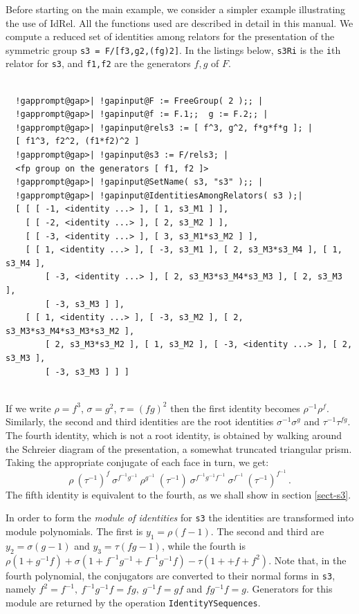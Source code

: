 \documentclass[a4paper,11pt]{report}
\begin{document}
{{ Before starting on the main example, we consider a simpler example
illustrating the use of \textsf{IdRel}. All the functions used are described in detail in this manual. We compute a
reduced set of identities among relators for the presentation of the symmetric
group \texttt{s3 =
F/[f\texttt{}3,g\texttt{}2,(fg)\texttt{}2]}. In the listings below, \texttt{s3{\textunderscore}Ri} is the \texttt{i}\texttt{}th relator for \texttt{s3}, and \texttt{f1,f2} are the generators $f,g$ of $F$. 

 
\begin{Verbatim}[commandchars=!@|,fontsize=\small,frame=single,label=Example]
  
  !gapprompt@gap>| !gapinput@F := FreeGroup( 2 );; |
  !gapprompt@gap>| !gapinput@f := F.1;;  g := F.2;; |
  !gapprompt@gap>| !gapinput@rels3 := [ f^3, g^2, f*g*f*g ]; |
  [ f1^3, f2^2, (f1*f2)^2 ]
  !gapprompt@gap>| !gapinput@s3 := F/rels3; |
  <fp group on the generators [ f1, f2 ]>
  !gapprompt@gap>| !gapinput@SetName( s3, "s3" );; |
  !gapprompt@gap>| !gapinput@IdentitiesAmongRelators( s3 );|
  [ [ [ -1, <identity ...> ], [ 1, s3_M1 ] ], 
    [ [ -2, <identity ...> ], [ 2, s3_M2 ] ], 
    [ [ -3, <identity ...> ], [ 3, s3_M1*s3_M2 ] ], 
    [ [ 1, <identity ...> ], [ -3, s3_M1 ], [ 2, s3_M3*s3_M4 ], [ 1, s3_M4 ], 
        [ -3, <identity ...> ], [ 2, s3_M3*s3_M4*s3_M3 ], [ 2, s3_M3 ], 
        [ -3, s3_M3 ] ], 
    [ [ 1, <identity ...> ], [ -3, s3_M2 ], [ 2, s3_M3*s3_M4*s3_M3*s3_M2 ], 
        [ 2, s3_M3*s3_M2 ], [ 1, s3_M2 ], [ -3, <identity ...> ], [ 2, s3_M3 ], 
        [ -3, s3_M3 ] ] ]
  
\end{Verbatim}
 If we write $\rho=f^3$, $\sigma=g^2$, $\tau=(fg)^2$ then the first identity becomes $\rho^{-1} \rho^{f}$. Similarly, the second and third identities are the root identities $\sigma^{-1} \sigma^{g}$ and $\tau^{-1} \tau^{fg}$. The fourth identity, which is not a root identity, is obtained by walking
around the Schreier diagram of the presentation, a somewhat truncated
triangular prism. Taking the appropriate conjugate of each face in turn, we
get: 
\[ \rho\ (\tau^{-1})^f\ \sigma^{f^{-1}g^{-1}}\ \rho^{g^{-1}}\ (\tau^{-1})\
\sigma^{f^{-1}g^{-1}f^{-1}}\ \sigma^{f^{-1}}\ (\tau^{-1})^{f^{-1}}\, . \]
 The fifth identity is equivalent to the fourth, as we shall show in section \ref{sect-s3}. 

 In order to form the \emph{module of identities} for \texttt{s3} the identities are transformed into module polynomials. The first is $y_1 = \rho(f-1)$. The second and third are $y_2 = \sigma(g-1)$ and $y_3 = \tau(fg-1)$, while the fourth is $\rho(1+g^{-1}f) + \sigma(1+f^{-1}g^{-1}+f^{-1}g^{-1}f) - \tau(1++f+f^2)$. Note that, in the fourth polynomial, the conjugators are converted to their
normal forms in \texttt{s3}, namely $f^2=f^{-1},\ f^{-1}g^{-1}f=fg,\ g^{-1}f=gf$ and $fg^{-1}f=g$. Generators for this module are returned by the operation \texttt{IdentityYSequences}. 

}}
\end{document}

